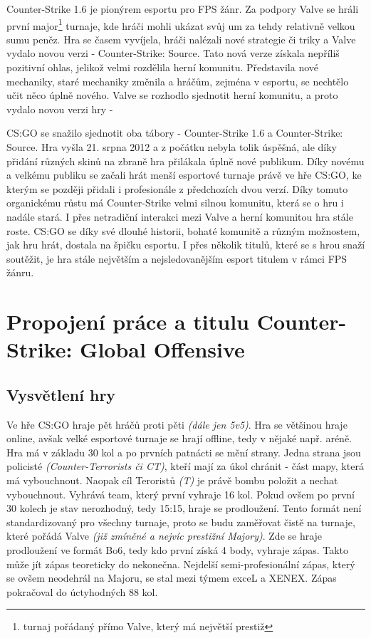 Counter-Strike 1.6 je pionýrem esportu pro \ac{FPS} žánr. Za podpory Valve se hráli první major\footnote{turnaj pořádaný přímo Valve, který má největší prestiž} turnaje, kde hráči mohli ukázat svůj um za tehdy relativně velkou
sumu peněz. Hra se časem vyvíjela, hráči nalézali nové strategie či triky a Valve vydalo novou verzi - Counter-Strike: Source. Tato nová verze získala nepříliš pozitivní ohlas, jelikož velmi rozdělila herní komunitu. Představila 
nové mechaniky, staré mechaniky změnila a hráčům, zejména v esportu, se nechtělo učit něco úplně nového. Valve se rozhodlo sjednotit herní komunitu, a proto vydalo novou verzi hry - 

\ac{CS:GO} se snažilo sjednotit oba tábory - Counter-Strike 1.6 a Counter-Strike: Source. Hra vyšla 21. srpna 2012 a z počátku nebyla tolik úspěšná, ale díky přidání různých skinů\cite{Valve2013} na zbraně hra přilákala
úplně nové publikum. Díky novému a velkému publiku se začali hrát menší esportové turnaje právě ve hře \ac{CS:GO}, ke kterým se později přidali i profesionále z předchozích dvou verzí. Díky tomuto organickému růstu má
Counter-Strike velmi silnou komunitu, která se o hru i nadále stará. I přes netradiční interakci mezi Valve a herní komunitou hra stále roste. \ac{CS:GO} se díky své dlouhé historii, bohaté komunitě a různým možnostem,
jak hru hrát, dostala na špičku esportu. I přes několik titulů, které se s hrou snaží soutěžit, je hra stále největším a nejsledovanějším esport titulem v rámci \ac{FPS} žánru\cite{Henningson2020}.

\section{Propojení práce a titulu Counter-Strike: Global Offensive}
\subsection{Vysvětlení hry}
Ve hře \ac{CS:GO} hraje pět hráčů proti pěti \textit{(dále jen 5v5)}. Hra se většinou hraje online, avšak velké esportové turnaje se hrají offline, tedy v nějaké např. aréně. Hra má v základu 30 kol a po 
prvních patnácti se mění strany. Jedna strana jsou policisté \textit{(Counter-Terrorists či CT)}, kteří mají za úkol chránit  - část mapy, která má vybouchnout. Naopak cíl Teroristů \textit{(T)} je právě
bombu položit a  nechat vybouchnout. Vyhrává team, který první vyhraje 16 kol. Pokud ovšem po první 30 kolech je stav nerozhodný, tedy 15:15, hraje se prodloužení. Tento formát není standardizovaný pro
všechny turnaje, proto se budu zaměřovat čistě na turnaje, které pořádá Valve \textit{(již zmíněné a nejvíc prestižní Majory)}. Zde se hraje prodloužení ve formát Bo6, tedy kdo první získá 4 body, vyhraje zápas. Takto 
může jít zápas teoreticky do nekonečna. Nejdelší semi-profesionální zápas, který se ovšem neodehrál na Majoru, se stal mezi týmem exceL a XENEX\cite{hltv.org2015}. Zápas pokračoval do úctyhodných 88 kol.

